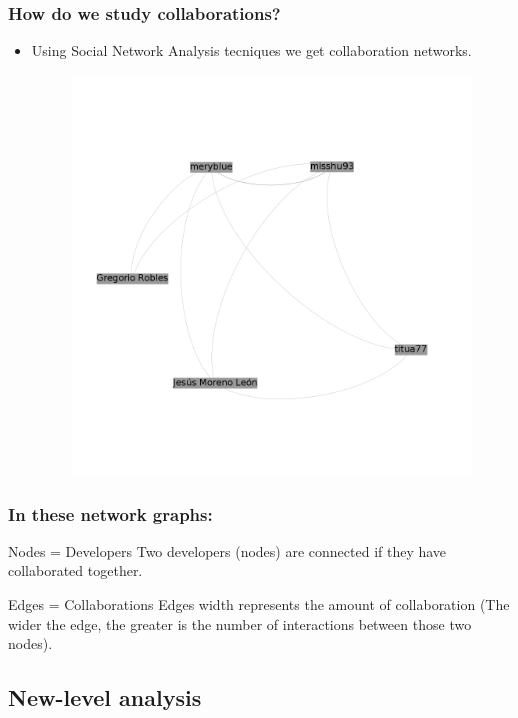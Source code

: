 \documentclass{beamer}
\begin{document}
\begin{frame}
\frametitle{How do we study collaborations?}
\begin{itemize}
\item Using Social Network Analysis tecniques we get collaboration networks.
\begin{figure}
\includegraphics[width=0.7\linewidth]{example-graph1.png}
\end{figure}
\end{itemize}
\end{frame}


\begin{frame}
\frametitle{In these network graphs:}
\begin{block}{Nodes = Developers}
Two developers (nodes) are connected if they have collaborated together.
\end{block}

\begin{block}{Edges = Collaborations}
Edges width represents the amount of collaboration
(The wider the edge, the greater is the number of interactions between those two nodes).
\end{block}

\end{frame}


\subsection{New-level analysis} %
\end{document}
